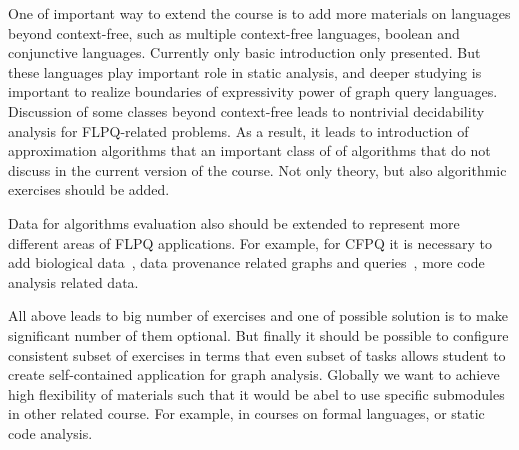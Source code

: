 \documentclass[sigconf]{acmart}
\begin{document}
One of important way to extend the course is to add more materials on languages beyond context-free, such as multiple context-free languages, boolean and conjunctive languages. 
Currently only basic introduction only presented. 
But these languages play important role in static analysis, and deeper studying is important to realize boundaries of expressivity power of graph query languages.
Discussion of some classes beyond context-free leads to nontrivial decidability analysis for FLPQ-related problems.
As a result, it leads to introduction of approximation algorithms that an important class of of algorithms that do not discuss in the current version of the course.
Not only theory, but also algorithmic exercises should be added.

Data for algorithms evaluation also should be extended to represent more different areas of FLPQ applications.
For example, for CFPQ it is necessary to add biological data~\cite{SevonEronen+2008+157+172}, data provenance related graphs and queries~\cite{8731467}, more code analysis related data.

All above leads to big number of exercises and one of possible solution is to make significant number of them optional.
But finally it should be possible to configure consistent subset of exercises in terms that even subset of tasks allows student to create self-contained application for graph analysis.
Globally we want to achieve high flexibility of materials such that it would be abel to use specific submodules in other related course.
For example, in courses on formal languages, or static code analysis.




\end{document}

